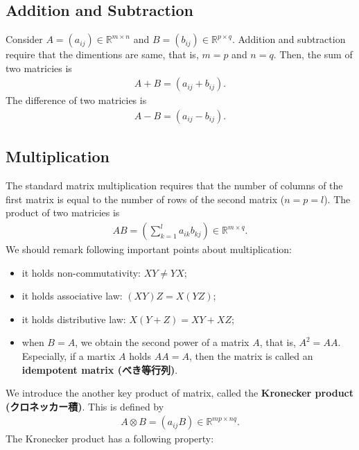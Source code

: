 \documentclass[
  12pt,
]{article}
\providecommand{\tightlist}{%
  \setlength{\itemsep}{0pt}\setlength{\parskip}{0pt}}
\begin{document}
\hypertarget{addition-and-subtraction}{%
\subsection{Addition and Subtraction}\label{addition-and-subtraction}}

Consider \(A = (a_{ij}) \in \mathbb{R}^{m \times n}\) and
\(B = (b_{ij}) \in \mathbb{R}^{p \times q}\). Addition and subtraction
require that the dimentions are same, that is, \(m = p\) and \(n = q\).
Then, the sum of two matricies is \begin{align*}
  A + B = (a_{ij} + b_{ij}).
\end{align*} The difference of two matricies is \begin{align*}
  A - B = (a_{ij} - b_{ij}).
\end{align*}

\hypertarget{multiplication}{%
\subsection{Multiplication}\label{multiplication}}

The standard matrix multiplication requires that the number of columns
of the first matrix is equal to the number of rows of the second matrix
(\(n = p = l\)). The product of two matricies is \begin{align*}
  AB = (\sum_{k=1}^l a_{ik} b_{kj}) \in \mathbb{R}^{m \times q}.
\end{align*} We should remark following important points about
multiplication:

\begin{itemize}
\tightlist
\item
  it holds non-commutativity: \(XY \not= YX\);
\item
  it holds associative law: \((XY)Z = X(YZ)\);
\item
  it holds distributive law: \(X(Y + Z) = XY + XZ\);
\item
  when \(B = A\), we obtain the second power of a matrix \(A\), that is,
  \(A^2 = A A\). Especially, if a martix \(A\) holds \(AA = A\), then
  the matrix is called an \textbf{idempotent matrix (べき等行列)}.
\end{itemize}

We introduce the another key product of matrix, called the
\textbf{Kronecker product (クロネッカー積)}. This is defined by
\begin{align*}
  A \otimes B = (a_{ij} B) \in \mathbb{R}^{mp \times nq}.
\end{align*} The Kronecker product has a following property:
\end{document}

